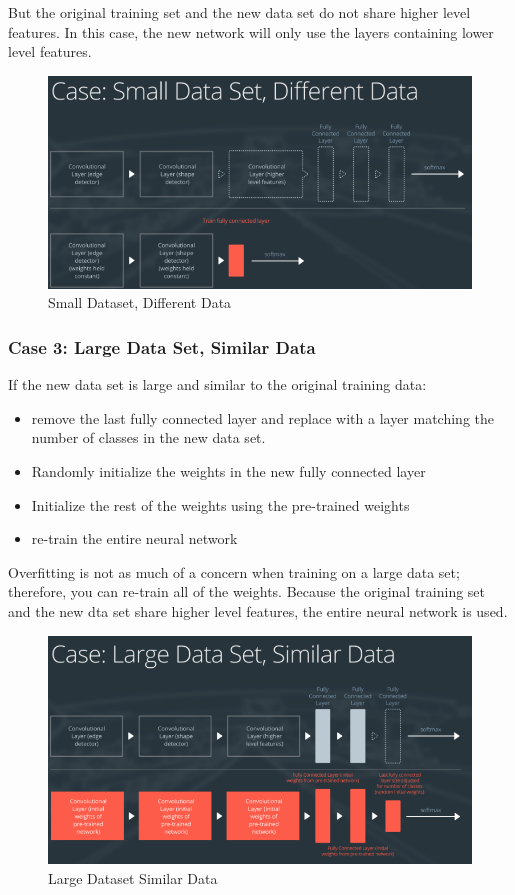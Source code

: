 \documentclass[11pt, a4paper]{article}
\begin{document}
But the original training set and the new data set do not share higher level features. In this case, the new network will only use the layers containing lower level features.


\begin{figure}[htpb!]
	\centering
	\includegraphics[width=0.8\linewidth]{small_dataset_different_data}
	\caption{Small Dataset, Different Data}
	\label{fig:small_dataset_different_data}
\end{figure}



\subsubsection{Case 3: Large Data Set, Similar Data}%
\label{ssub:large_data_set_similar_data}

If the new data set is large and similar to the original training data:

\begin{itemize}
	\item remove the last fully connected layer and replace with a layer matching the number of classes in the new data set.
	\item Randomly initialize the weights in the new fully connected layer
	\item Initialize the rest of the weights using the pre-trained weights
	\item re-train the entire neural network
\end{itemize}

Overfitting is not as much of a concern when training on a large data set; therefore, you can re-train all of the weights. Because the original training set and the new dta set share higher level features, the entire neural network is used. 



\begin{figure}[htpb!]
	\centering
	\includegraphics[width=0.8\linewidth]{large_dataset_similar_data}
	\caption{Large Dataset Similar Data}
	\label{fig:large_dataset_similar_data}
\end{figure}
\end{document}
